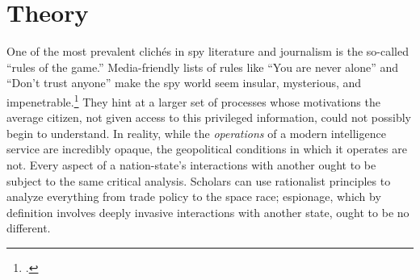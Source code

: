 \documentclass[14pt]{extarticle}
\begin{document}



\section{Theory}
One of the most prevalent clich\'es in spy literature and journalism is the so-called \enquote{rules of the game.} Media-friendly lists of rules like \enquote{You are never alone} and \enquote{Don't trust anyone} make the spy world seem insular, mysterious, and impenetrable.\footcite{myre_moscow_2019} They hint at a larger set of processes whose motivations the average citizen, not given access to this privileged information, could not possibly begin to understand. In reality, while the \emph{operations} of a modern intelligence service are incredibly opaque, the geopolitical conditions in which it operates are not. Every aspect of a nation-state's interactions with another ought to be subject to the same critical analysis. Scholars can use rationalist principles to analyze everything from trade policy to the space race; espionage, which by definition involves deeply invasive interactions with another state, ought to be no different.
\end{document}
